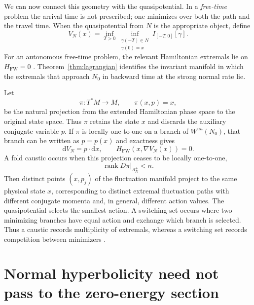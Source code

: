 \documentclass[11pt]{article}
\theoremstyle{definition}
\theoremstyle{remark}
\newcommand{\Lagr}{\Lambda}
\newcommand{\Hs}{H_{\mathrm{FW}}}
\newcommand{\dd}{\mathrm{d}}
\newcommand{\rank}{\operatorname{rank}}
\begin{document}
We can now connect this geometry with the quasipotential.  In a \emph{free-time} problem the arrival time is not prescribed; one minimizes over both the path and the travel time.  When the quasipotential from $N$ is the appropriate object, define
\begin{equation}
V_N(x)=\inf_{T>0}\inf_{\substack{\gamma(-T)\in N\\ \gamma(0)=x}}
I_{[-T,0]}[\gamma].
\label{eq:quasipotential-N}
\end{equation}
For an autonomous free-time problem, the relevant Hamiltonian extremals lie on $\Hs=0$ \cite{FreidlinWentzell2012}.  Theorem~\ref{thm:lagrangian} identifies the invariant manifold in which the extremals that approach $N_0$ in backward time at the strong normal rate lie.

Let
\begin{equation}
\pi:T^*M\longrightarrow M,
\qquad
\pi(x,p)=x,
\label{eq:cotangent-projection}
\end{equation}
be the natural projection from the extended Hamiltonian phase space to the original state space.  Thus $\pi$ retains the state $x$ and discards the auxiliary conjugate variable $p$.  If $\pi$ is locally one-to-one on a branch of $W^{uu}(N_0)$, that branch can be written as $p=p(x)$ and exactness gives
\begin{equation}
\dd V_N=p\cdot\dd x,
\qquad
\Hs(x,\nabla V_N(x))=0.
\label{eq:HJ}
\end{equation}
A fold caustic occurs when this projection ceases to be locally one-to-one,
\begin{equation}
\rank D\pi|_{\Lagr_N^+}<n.
\label{eq:caustic-condition}
\end{equation}
Then distinct points $(x,p_j)$ of the fluctuation manifold project to the same physical state $x$, corresponding to distinct extremal fluctuation paths with different conjugate momenta and, in general, different action values.  The quasipotential selects the smallest action.  A switching set occurs where two minimizing branches have equal action and exchange which branch is selected.  Thus a caustic records multiplicity of extremals, whereas a switching set records competition between minimizers \cite{MaierStein1993PRL,MaierStein1996,MaierStein1997,SmelyanskiyDykmanMaier1997}.

\section{Normal hyperbolicity need not pass to the zero-energy section}
\label{sec:counterexample}
\end{document}
